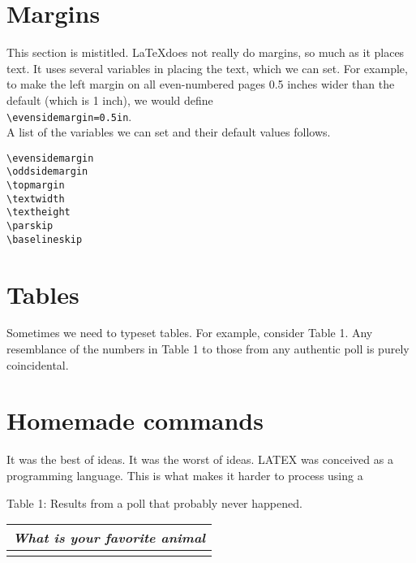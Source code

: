 \documentclass[12pt]{article}
\begin{document}
\section{Margins}
This section is mistitled. \LaTeX does not really do margins, so much as it
places text. It uses several variables in placing the text, which we can set.
For example, to make the left margin on all even-numbered pages 0.5 inches
wider than the default (which is 1 inch), we would define\\
\verb|\evensidemargin=0.5in|.\\
A list of the variables we can set and their default values follows.
\begin{verbatim}
\evensidemargin
\oddsidemargin
\topmargin
\textwidth
\textheight
\parskip
\baselineskip
\end{verbatim}
\section{Tables}
Sometimes we need to typeset tables. For example, consider Table 1. Any
resemblance of the numbers in Table 1 to those from any authentic poll is
purely coincidental.
\section{Homemade commands}
It was the best of ideas. It was the worst of ideas. LATEX was conceived as
a programming language. This is what makes it harder to process using a
\begin{center}
Table 1: Results from a poll that probably never happened.
\begin{tabular}{ccc}
\toprule 
\multicolumn{3}{c}{\textit{What is your favorite animal}}\\
\bottomrule\\
\end{tabular}
\end{center}
\end{document}
